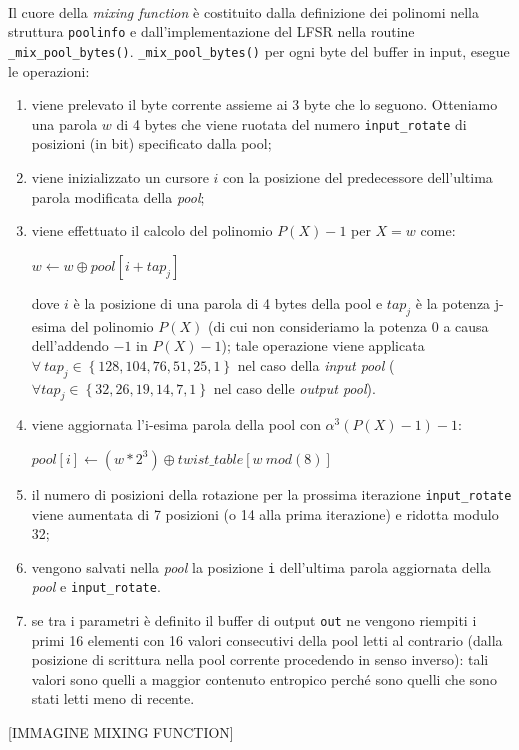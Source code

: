 \documentclass{article}
\begin{document}
 \paragraph{} Il cuore della \emph{mixing function} è costituito dalla
 definizione dei polinomi nella struttura \verb+poolinfo+ e dall'implementazione
 del LFSR nella routine \verb+_mix_pool_bytes()+. 
 \newline \verb+_mix_pool_bytes()+ per ogni byte del buffer in input, esegue le
 operazioni:
 \begin{enumerate}
   \item viene prelevato il byte corrente assieme ai 3 byte che lo seguono.
   Otteniamo una parola $w$ di 4 bytes che viene ruotata del numero
   \verb+input_rotate+ di posizioni (in bit) specificato dalla pool;
   \item viene inizializzato un cursore $i$ con la posizione del
   predecessore dell'ultima parola modificata della \emph{pool};
   \item viene effettuato il calcolo del polinomio $P(X)-1$ per $X=w$
   come:
   \begin{center}
   $w\leftarrow w \oplus pool[i + tap_j]$
   \end{center}
   dove $i$ è la posizione di una parola di 4 bytes della pool e $tap_j$ è la
   potenza j-esima del polinomio $P(X)$ (di cui non consideriamo la potenza 0
   a causa dell'addendo $-1$ in $P(X)-1$); tale operazione viene applicata 
   $\forall\ tap_j \in \left\{128, 104, 76, 51, 25, 1 \right\}$ nel caso della
   \emph{input pool} ($\forall tap_j \in \left\{32, 26, 19, 14, 7, 1 \right\}$
   nel caso delle \emph{output pool}).
   \item viene aggiornata l'i-esima parola della pool con 
   $\alpha^3\left(P(X)-1\right)-1$:
   \begin{center}
   $pool\left[i\right] \leftarrow  \left(w*2^3\right) \oplus
   twist\_table\left[w\ mod(8)\right]$
   \end{center}
   \item il numero di posizioni della rotazione per la prossima iterazione
   \verb+input_rotate+ viene aumentata di 7 posizioni (o 14 alla prima
   iterazione) e ridotta modulo 32;
   \item vengono salvati nella \emph{pool} la posizione \verb+i+ dell'ultima
   parola aggiornata della \emph{pool} e \verb+input_rotate+.
   \item se tra i parametri è definito il buffer di output \verb+out+ ne vengono
   riempiti i primi 16 elementi con 16 valori consecutivi della pool letti al
   contrario (dalla posizione di scrittura nella pool corrente procedendo in
   senso inverso): tali valori sono quelli a maggior contenuto entropico
   perché sono quelli che sono stati letti meno di recente.
 \end{enumerate}
 \begin{center}
 [IMMAGINE MIXING FUNCTION]
 \end{center}
 
\end{document}
